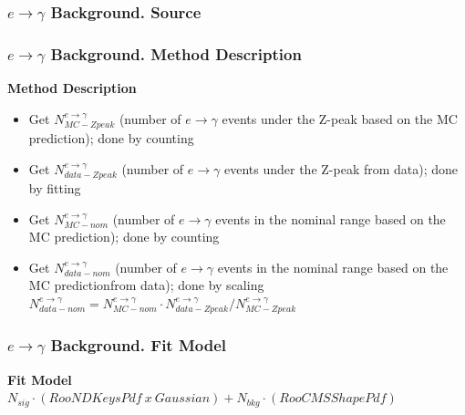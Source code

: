 \begin{frame}\frametitle{$e\rightarrow\gamma$ Background. Source}

\end{frame}%

\begin{frame}\frametitle{$e\rightarrow\gamma$ Background. Method Description}
{\footnotesize\bfseries{Method Description}}
\scriptsize
\begin{itemize}
  \item Get $N_{MC-Zpeak}^{e\rightarrow\gamma}$ (number of $e\rightarrow\gamma$ events under the Z-peak based on the MC prediction); done by counting
  \item Get $N_{data-Zpeak}^{e\rightarrow\gamma}$ (number of $e\rightarrow\gamma$ events under the Z-peak from data); done by fitting
  \item Get $N_{MC-nom}^{e\rightarrow\gamma}$ (number of $e\rightarrow\gamma$ events in the nominal range based on the MC prediction); done by counting
  \item Get $N_{data-nom}^{e\rightarrow\gamma}$ (number of $e\rightarrow\gamma$ events in the nominal range based on the MC predictionfrom data); done by scaling {\footnotesize\bfseries{$N_{data-nom}^{e\rightarrow\gamma} = N_{MC-nom}^{e\rightarrow\gamma} \cdot N_{data-Zpeak}^{e\rightarrow\gamma}/N_{MC-Zpeak}^{e\rightarrow\gamma}$}}
\end{itemize}
\end{frame}%

\begin{frame}\frametitle{$e\rightarrow\gamma$ Background. Fit Model}
{\footnotesize\bfseries{Fit Model}}\\
\scriptsize
$N_{sig} \cdot (RooNDKeysPdf~x~Gaussian) +  N_{bkg} \cdot (RooCMSShapePdf)$\\
\end{frame}%

